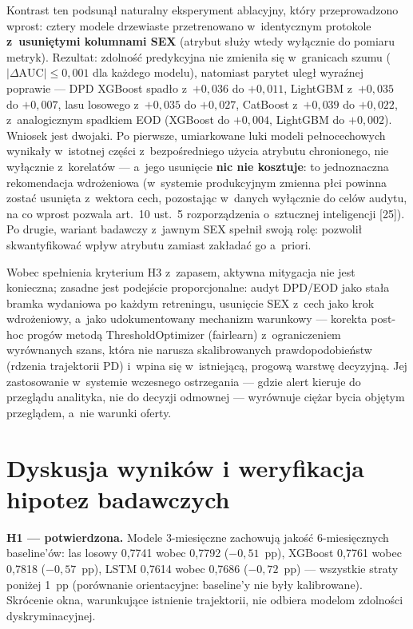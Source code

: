 Kontrast ten podsunął naturalny eksperyment ablacyjny, który przeprowadzono
wprost: cztery modele drzewiaste przetrenowano w~identycznym protokole
\textbf{z~usuniętymi kolumnami SEX} (atrybut służy wtedy wyłącznie do pomiaru
metryk). Rezultat: zdolność predykcyjna nie zmieniła się w~granicach szumu
($|\Delta\mathrm{AUC}| \leq 0{,}001$ dla każdego modelu), natomiast parytet
uległ wyraźnej poprawie --- DPD XGBoost spadło z~$+0{,}036$ do $+0{,}011$,
LightGBM z~$+0{,}035$ do $+0{,}007$, lasu losowego z~$+0{,}035$ do $+0{,}027$,
CatBoost z~$+0{,}039$ do $+0{,}022$, z~analogicznym spadkiem EOD (XGBoost do
$+0{,}004$, LightGBM do $+0{,}002$). Wniosek jest dwojaki. Po pierwsze,
umiarkowane luki modeli pełnocechowych wynikały w~istotnej części
z~bezpośredniego użycia atrybutu chronionego, nie wyłącznie z~korelatów ---
a~jego usunięcie \textbf{nic nie kosztuje}: to jednoznaczna rekomendacja
wdrożeniowa (w~systemie produkcyjnym zmienna płci powinna zostać usunięta
z~wektora cech, pozostając w~danych wyłącznie do celów audytu, na co wprost
pozwala art.~10 ust.~5 rozporządzenia o~sztucznej inteligencji [25]).
Po drugie, wariant badawczy z~jawnym SEX spełnił swoją rolę: pozwolił
skwantyfikować wpływ atrybutu zamiast zakładać go a~priori.

Wobec spełnienia kryterium H3 z~zapasem, aktywna mitygacja nie jest konieczna;
zasadne jest podejście proporcjonalne: audyt DPD/EOD jako stała bramka
wydaniowa po każdym retreningu, usunięcie SEX z~cech jako krok wdrożeniowy,
a~jako udokumentowany mechanizm warunkowy --- korekta post-hoc progów metodą
ThresholdOptimizer (fairlearn) z~ograniczeniem wyrównanych szans, która nie
narusza skalibrowanych prawdopodobieństw (rdzenia trajektorii PD) i~wpina się
w~istniejącą, progową warstwę decyzyjną. Jej zastosowanie w~systemie wczesnego
ostrzegania --- gdzie alert kieruje do przeglądu analityka, nie do decyzji
odmownej --- wyrównuje ciężar bycia objętym przeglądem, a~nie warunki oferty.

\section{Dyskusja wyników i weryfikacja hipotez badawczych}

\textbf{H1 --- potwierdzona.} Modele 3-miesięczne zachowują jakość
6-miesięcznych baseline'ów: las losowy 0,7741 wobec 0,7792 ($-0{,}51$~pp),
XGBoost 0,7761 wobec 0,7818 ($-0{,}57$~pp), LSTM 0,7614 wobec 0,7686
($-0{,}72$~pp) --- wszystkie straty poniżej 1~pp (porównanie orientacyjne:
baseline'y nie były kalibrowane). Skrócenie okna, warunkujące istnienie
trajektorii, nie odbiera modelom zdolności dyskryminacyjnej.

